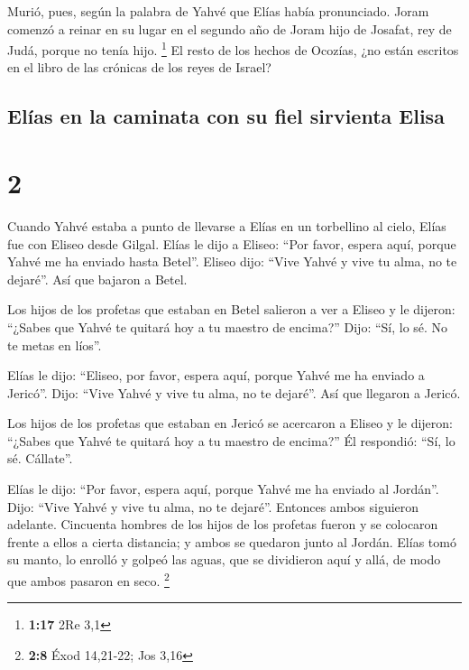  Murió, pues, según la palabra de Yahvé que Elías había
pronunciado. Joram comenzó a reinar en su lugar en el segundo año de
Joram hijo de Josafat, rey de Judá, porque no tenía hijo. \footnote{\textbf{1:17}
  2Re 3,1}  El resto de los hechos de Ocozías, ¿no están
escritos en el libro de las crónicas de los reyes de Israel?

\hypertarget{eluxedas-en-la-caminata-con-su-fiel-sirvienta-elisa}{%
\subsection{Elías en la caminata con su fiel sirvienta
Elisa}\label{eluxedas-en-la-caminata-con-su-fiel-sirvienta-elisa}}

\hypertarget{section-1}{%
\section{2}\label{section-1}}

 Cuando Yahvé estaba a punto de llevarse a Elías en un
torbellino al cielo, Elías fue con Eliseo desde Gilgal. 
Elías le dijo a Eliseo: ``Por favor, espera aquí, porque Yahvé me ha
enviado hasta Betel''. Eliseo dijo: ``Vive Yahvé y vive tu alma, no te
dejaré''. Así que bajaron a Betel.

 Los hijos de los profetas que estaban en Betel salieron a
ver a Eliseo y le dijeron: ``¿Sabes que Yahvé te quitará hoy a tu
maestro de encima?'' Dijo: ``Sí, lo sé. No te metas en líos''.

 Elías le dijo: ``Eliseo, por favor, espera aquí, porque
Yahvé me ha enviado a Jericó''. Dijo: ``Vive Yahvé y vive tu alma, no te
dejaré''. Así que llegaron a Jericó.

 Los hijos de los profetas que estaban en Jericó se
acercaron a Eliseo y le dijeron: ``¿Sabes que Yahvé te quitará hoy a tu
maestro de encima?'' Él respondió: ``Sí, lo sé. Cállate''.

 Elías le dijo: ``Por favor, espera aquí, porque Yahvé me
ha enviado al Jordán''. Dijo: ``Vive Yahvé y vive tu alma, no te
dejaré''. Entonces ambos siguieron adelante.  Cincuenta
hombres de los hijos de los profetas fueron y se colocaron frente a
ellos a cierta distancia; y ambos se quedaron junto al Jordán.
 Elías tomó su manto, lo enrolló y golpeó las aguas, que
se dividieron aquí y allá, de modo que ambos pasaron en seco.
\footnote{\textbf{2:8} Éxod 14,21-22; Jos 3,16}

